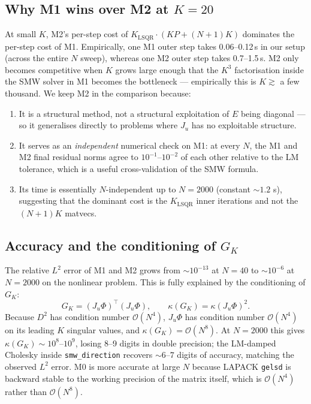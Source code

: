 \documentclass[11pt,a4paper]{article}
\newcommand{\Order}{\mathcal{O}}
\newcommand{\GK}{G_{K}}
\begin{document}
\subsection{Why M1 wins over M2 at $K = 20$}

At small $K$, M2's per-step cost of
$K_{\mathrm{LSQR}}\cdot (KP + (N+1)K)$ dominates the per-step cost of M1.
Empirically, one M1 outer step takes 0.06--0.12\,s in our setup (across the
entire $N$ sweep), whereas one M2 outer step takes 0.7--1.5\,s. M2 only becomes
competitive when $K$ grows large enough that the $K^{3}$ factorisation inside
the SMW solver in M1 becomes the bottleneck — empirically this is $K \gtrsim$
a few thousand. We keep M2 in the comparison because:

\begin{enumerate}
    \item It is a structural method, not a structural exploitation of $E$ being
        diagonal --- so it generalises directly to problems where $J_{u}$ has
        no exploitable structure.
    \item It serves as an \emph{independent} numerical check on M1: at every
        $N$, the M1 and M2 final residual norms agree to $10^{-1}$--$10^{-2}$
        of each other relative to the LM tolerance, which is a useful
        cross-validation of the SMW formula.
    \item Its time is essentially $N$-independent up to $N=2000$ (constant
        $\sim 1.2$ s), suggesting that the dominant cost is the $K_{\mathrm{LSQR}}$
        inner iterations and not the $(N+1)K$ matvecs.
\end{enumerate}

\subsection{Accuracy and the conditioning of $\GK$}

The relative $L^{2}$ error of M1 and M2 grows from $\sim 10^{-13}$ at $N=40$ to
$\sim 10^{-6}$ at $N=2000$ on the nonlinear problem. This is fully explained by
the conditioning of $\GK$:
\begin{equation}
\GK = (J_{u}\Phi)^{\!\top}(J_{u}\Phi),
\qquad \kappa(\GK) = \kappa(J_{u}\Phi)^{2}.
\end{equation}
Because $D^{2}$ has condition number $\Order(N^{4})$, $J_{u}\Phi$ has condition
number $\Order(N^{4})$ on its leading $K$ singular values, and
$\kappa(\GK) = \Order(N^{8})$. At $N=2000$ this gives $\kappa(\GK)\sim 10^{8}$--$10^{9}$,
losing 8--9 digits in double precision; the LM-damped Cholesky inside
\texttt{smw\_direction} recovers $\sim 6$--$7$ digits of accuracy, matching the
observed $L^{2}$ error. M0 is more accurate at large $N$ because LAPACK
\texttt{gelsd} is backward stable to the working precision of the matrix
itself, which is $\Order(N^{4})$ rather than $\Order(N^{8})$.
\end{document}
